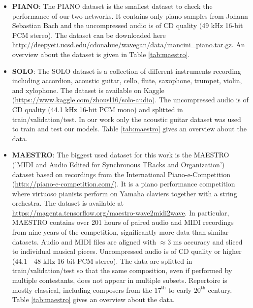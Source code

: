 \documentclass{article} %
\begin{document}
\begin{itemize}
    \item \textbf{PIANO}: The PIANO dataset is the smallest dataset to check the performance of our two networks. It contains only piano samples from Johann Sebastian Bach and the uncompressed audio is of CD quality (49 kHz 16-bit PCM stereo). The dataset can be downloaded here \url{http://deepyeti.ucsd.edu/cdonahue/wavegan/data/mancini_piano.tar.gz}. An overview about the dataset is given in Table \ref{tab:maestro}.
    \item \textbf{SOLO}: The SOLO dataset is a collection of different instruments recording including accordion, acoustic guitar, cello, flute, saxophone, trumpet, violin, and xylophone. The dataset is available on Kaggle (\url{https://www.kaggle.com/zhousl16/solo-audio}). The uncompressed audio is of CD quality (44.1 kHz 16-bit PCM mono) and splitted in train/validation/test. In our work only the acoustic guitar dataset was used to train and test our models. Table \ref{tab:maestro} gives an overview about the data.
    \item \textbf{MAESTRO}: The biggest used dataset for this work is the MAESTRO ('MIDI and Audio Edited for Synchronous TRacks and Organization') dataset based on recordings from the International Piano-e-Competition (\url{http://piano-e-competition.com/}). It is a piano performance competition where virtuoso pianists perform on Yamaha claviers together with a string orchestra. The dataset is available at \url{https://magenta.tensorflow.org/maestro-wave2midi2wave}. In particular, MAESTRO contains over 201 hours of paired audio and MIDI recordings from nine years of the competition, significantly more data than similar datasets. Audio and MIDI files are aligned with $\approx 3 \textrm{ ms}$ accuracy and sliced to individual musical pieces. Uncompressed audio is of CD quality or higher (44.1 - 48 kHz 16-bit PCM stereo). The data are splitted in train/validation/test so that the same composition, even if performed by multiple contestants, does not appear in multiple subsets. Repertoire is mostly classical, including composers from the $17^\textrm{th}$ to early $20^\textrm{th}$ century. Table \ref{tab:maestro} gives an overview about the data.
\end{itemize}


\end{document}
